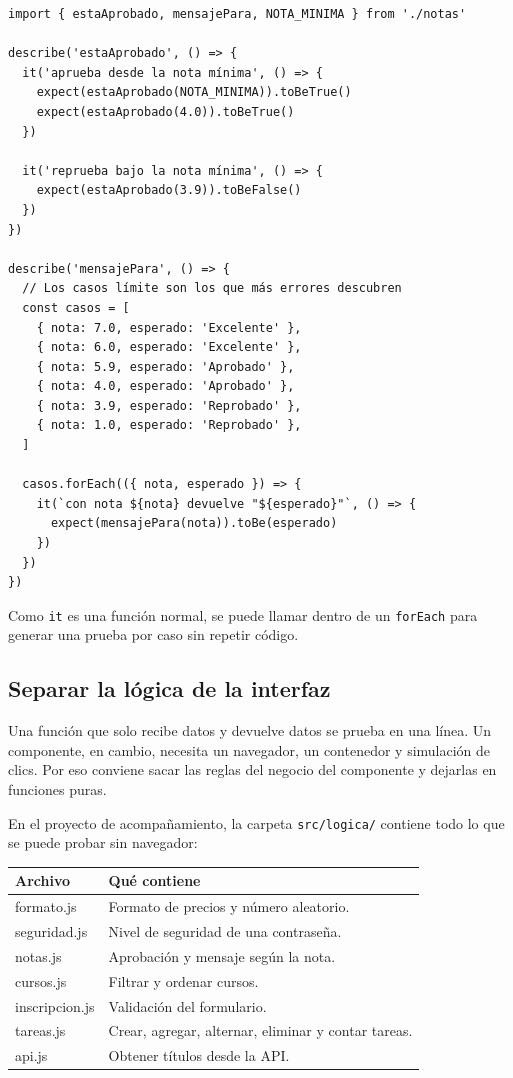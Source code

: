 \documentclass[11pt,a4paper]{article}
\newcommand{\cmd}[1]{\texttt{\color{reactdark}#1}}
\begin{document}
\begin{lstlisting}[language=JSX,title={\small\ttfamily src/logica/notas.spec.js}]
import { estaAprobado, mensajePara, NOTA_MINIMA } from './notas'

describe('estaAprobado', () => {
  it('aprueba desde la nota mínima', () => {
    expect(estaAprobado(NOTA_MINIMA)).toBeTrue()
    expect(estaAprobado(4.0)).toBeTrue()
  })

  it('reprueba bajo la nota mínima', () => {
    expect(estaAprobado(3.9)).toBeFalse()
  })
})

describe('mensajePara', () => {
  // Los casos límite son los que más errores descubren
  const casos = [
    { nota: 7.0, esperado: 'Excelente' },
    { nota: 6.0, esperado: 'Excelente' },
    { nota: 5.9, esperado: 'Aprobado' },
    { nota: 4.0, esperado: 'Aprobado' },
    { nota: 3.9, esperado: 'Reprobado' },
    { nota: 1.0, esperado: 'Reprobado' },
  ]

  casos.forEach(({ nota, esperado }) => {
    it(`con nota ${nota} devuelve "${esperado}"`, () => {
      expect(mensajePara(nota)).toBe(esperado)
    })
  })
})
\end{lstlisting}

Como \cmd{it} es una función normal, se puede llamar dentro de un \cmd{forEach} para generar una prueba por caso sin repetir código.

\subsection{Separar la lógica de la interfaz}

Una función que solo recibe datos y devuelve datos se prueba en una línea. Un componente, en cambio, necesita un navegador, un contenedor y simulación de clics. Por eso conviene sacar las reglas del negocio del componente y dejarlas en funciones puras.

En el proyecto de acompañamiento, la carpeta \cmd{src/logica/} contiene todo lo que se puede probar sin navegador:

\begin{center}
\small
\begin{tabular}{>{\ttfamily}l p{8.7cm}}
\toprule
\textrm{\textbf{Archivo}} & \textbf{Qué contiene} \\
\midrule
formato.js & Formato de precios y número aleatorio. \\
seguridad.js & Nivel de seguridad de una contraseña. \\
notas.js & Aprobación y mensaje según la nota. \\
cursos.js & Filtrar y ordenar cursos. \\
inscripcion.js & Validación del formulario. \\
tareas.js & Crear, agregar, alternar, eliminar y contar tareas. \\
api.js & Obtener títulos desde la API. \\
\bottomrule
\end{tabular}
\end{center}
\end{document}
